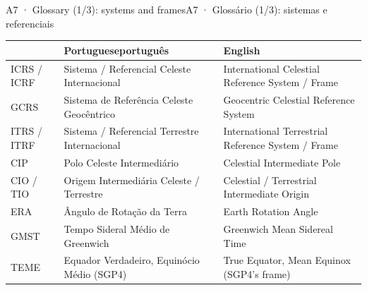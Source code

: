 \documentclass[aspectratio=169,11pt]{beamer}
\newcommand{\tr}[2]{\ifEN#2\else#1\fi}
\begin{document}
\begin{frame}{\tr{A7 · Glossário (1/3): sistemas e referenciais}{A7 · Glossary (1/3): systems and frames}}
  \centering
  \scriptsize
  \renewcommand{\arraystretch}{1.3}
  \setlength{\tabcolsep}{4pt}
  \begin{tabular}{@{}>{\raggedright\arraybackslash}p{1.8cm}>{\raggedright\arraybackslash}p{5.4cm}>{\raggedright\arraybackslash}p{5.4cm}@{}}
    \toprule
    & \tr{português}{Portuguese} & English \\
    \midrule
    ICRS / ICRF & Sistema / Referencial Celeste Internacional & International Celestial Reference System / Frame \\
    GCRS & Sistema de Referência Celeste Geocêntrico & Geocentric Celestial Reference System \\
    ITRS / ITRF & Sistema / Referencial Terrestre Internacional & International Terrestrial Reference System / Frame \\
    CIP & Polo Celeste Intermediário & Celestial Intermediate Pole \\
    CIO / TIO & Origem Intermediária Celeste / Terrestre & Celestial / Terrestrial Intermediate Origin \\
    ERA & Ângulo de Rotação da Terra & Earth Rotation Angle \\
    GMST & Tempo Sideral Médio de Greenwich & Greenwich Mean Sidereal Time \\
    TEME & Equador Verdadeiro, Equinócio Médio (SGP4) & True Equator, Mean Equinox (SGP4's frame) \\
    \bottomrule
  \end{tabular}
\end{frame}
\end{document}
